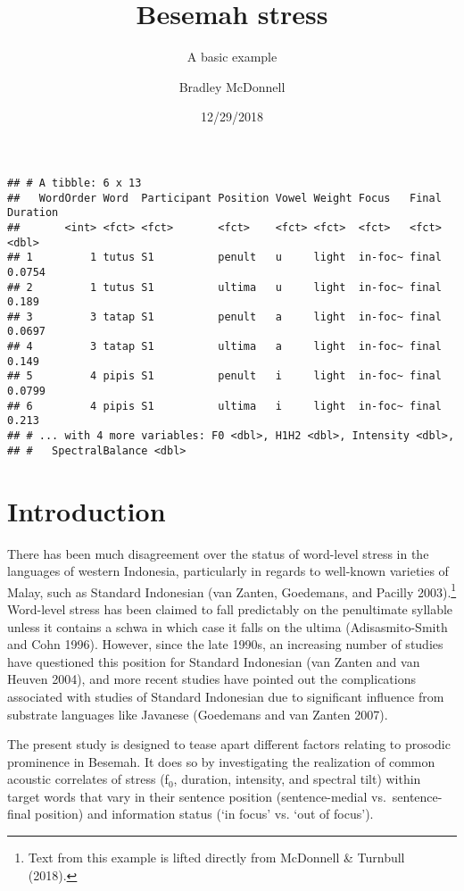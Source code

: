 \documentclass[]{article}
\title{Besemah stress}
\subtitle{A basic example}
\author{Bradley McDonnell}
\date{12/29/2018}
\let\rmarkdownfootnote\footnote%
\def\footnote{\protect\rmarkdownfootnote}
\begin{document}
\maketitle

\begin{verbatim}
## # A tibble: 6 x 13
##   WordOrder Word  Participant Position Vowel Weight Focus   Final Duration
##       <int> <fct> <fct>       <fct>    <fct> <fct>  <fct>   <fct>    <dbl>
## 1         1 tutus S1          penult   u     light  in-foc~ final   0.0754
## 2         1 tutus S1          ultima   u     light  in-foc~ final   0.189 
## 3         3 tatap S1          penult   a     light  in-foc~ final   0.0697
## 4         3 tatap S1          ultima   a     light  in-foc~ final   0.149 
## 5         4 pipis S1          penult   i     light  in-foc~ final   0.0799
## 6         4 pipis S1          ultima   i     light  in-foc~ final   0.213 
## # ... with 4 more variables: F0 <dbl>, H1H2 <dbl>, Intensity <dbl>,
## #   SpectralBalance <dbl>
\end{verbatim}

\section{Introduction}\label{introduction}

There has been much disagreement over the status of word-level stress in
the languages of western Indonesia, particularly in regards to
well-known varieties of Malay, such as Standard Indonesian (van Zanten,
Goedemans, and Pacilly 2003).\footnote{Text from this example is lifted
  directly from McDonnell \& Turnbull (2018).} Word-level stress has
been claimed to fall predictably on the penultimate syllable unless it
contains a schwa in which case it falls on the ultima (Adisasmito-Smith
and Cohn 1996). However, since the late 1990s, an increasing number of
studies have questioned this position for Standard Indonesian (van
Zanten and van Heuven 2004), and more recent studies have pointed out
the complications associated with studies of Standard Indonesian due to
significant influence from substrate languages like Javanese (Goedemans
and van Zanten 2007).

The present study is designed to tease apart different factors relating
to prosodic prominence in Besemah. It does so by investigating the
realization of common acoustic correlates of stress (f\(_0\), duration,
intensity, and spectral tilt) within target words that vary in their
sentence position (sentence-medial vs.~sentence-final position) and
information status (`in focus' vs. `out of focus').
\end{document}
